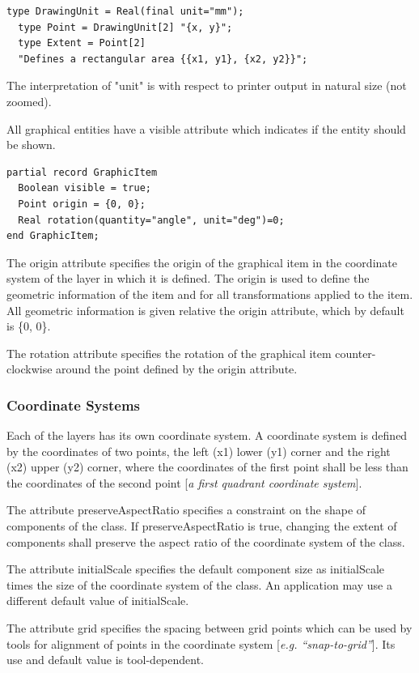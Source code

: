 \documentclass[10pt,a4paper]{report}
\def\doublelabel#1{\label{#1}\hypertarget{#1}{}}
\begin{document}
\begin{lstlisting}[language=modelica]
  type DrawingUnit = Real(final unit="mm");
  type Point = DrawingUnit[2] "{x, y}";
  type Extent = Point[2]
  "Defines a rectangular area {{x1, y1}, {x2, y2}}";
\end{lstlisting}
The interpretation of "unit" is with respect to printer output in
natural size (not zoomed).

All graphical entities have a visible attribute which indicates if the
entity should be shown.

\begin{lstlisting}[language=modelica]
partial record GraphicItem
  Boolean visible = true;
  Point origin = {0, 0};
  Real rotation(quantity="angle", unit="deg")=0;
end GraphicItem;
\end{lstlisting}
The origin attribute specifies the origin of the graphical item in the
coordinate system of the layer in which it is defined. The origin is
used to define the geometric information of the item and for all
transformations applied to the item. All geometric information is given
relative the origin attribute, which by default is \{0, 0\}.

The rotation attribute specifies the rotation of the graphical item
counter-clockwise around the point defined by the origin attribute.

\subsubsection{Coordinate Systems}\doublelabel{coordinate-systems}

Each of the layers has its own coordinate system. A coordinate system is
defined by the coordinates of two points, the left (x1) lower (y1)
corner and the right (x2) upper (y2) corner, where the coordinates of
the first point shall be less than the coordinates of the second point
{[}\emph{a first quadrant coordinate system}{]}.

The attribute preserveAspectRatio specifies a constraint on the shape of
components of the class. If preserveAspectRatio is true, changing the
extent of components shall preserve the aspect ratio of the coordinate
system of the class.

The attribute initialScale specifies the default component size as
initialScale times the size of the coordinate system of the class. An
application may use a different default value of initialScale.

The attribute grid specifies the spacing between grid points which can
be used by tools for alignment of points in the coordinate system
{[}\emph{e.g. ``snap-to-grid''}{]}. Its use and default value is
tool-dependent.
\end{document}
